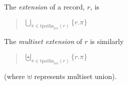 The  \textit{extension} of a record, $r$, is
\begin{quote}
  $\displaystyle{\bigcup_{\pi\in\mathrm{tpaths}_{\text{rec}}(r)}\{r.\pi\}}$
\end{quote}
The \textit{multiset extension} of $r$ is similarly
\begin{quote}
  $\displaystyle{\biguplus_{\pi\in\mathrm{tpaths}_{\text{rec}}(r)}\{r.\pi\}}$
\end{quote}
(where $\uplus$ represents multiset union).


